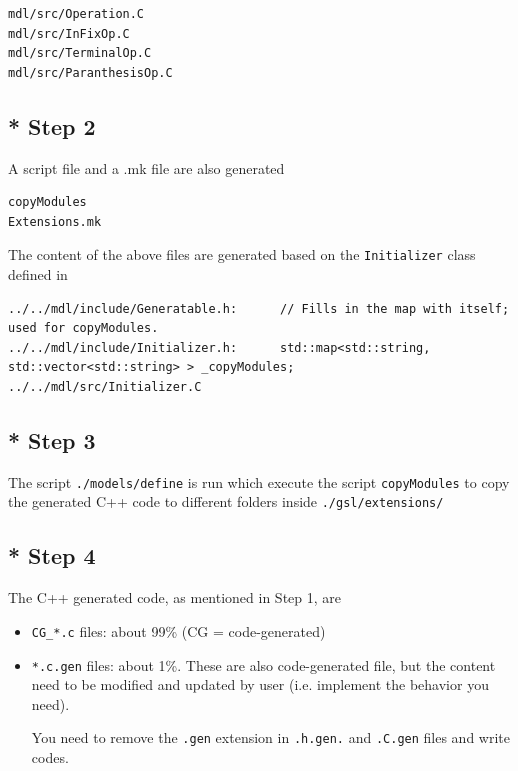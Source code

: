 \begin{verbatim}
mdl/src/Operation.C
mdl/src/InFixOp.C
mdl/src/TerminalOp.C
mdl/src/ParanthesisOp.C
\end{verbatim}


\subsection{* Step 2}

A script file and a .mk file are also generated
\begin{verbatim}
copyModules
Extensions.mk
\end{verbatim}

The content of the above files are generated based on the
\verb!Initializer! class defined in
\begin{verbatim}
../../mdl/include/Generatable.h:      // Fills in the map with itself; used for copyModules.
../../mdl/include/Initializer.h:      std::map<std::string, std::vector<std::string> > _copyModules;
../../mdl/src/Initializer.C
\end{verbatim}

\subsection{* Step 3}

The script \verb!./models/define! is run which execute the script
\verb!copyModules! to copy the generated C++ code to different folders inside
\verb!./gsl/extensions/!



\subsection{* Step 4}

The C++ generated code, as mentioned in Step 1, are
\begin{itemize}
  \item \verb!CG_*.c! files: about 99\% (CG = code-generated)
  
  \item \verb!*.c.gen! files: about 1\%. These are also code-generated file, but
  the content need to be modified and updated by user (i.e. implement the
  behavior you need).
  
  You need to remove the \verb!.gen! extension in \verb!.h.gen.! and 
  \verb!.C.gen! files and write codes.
  
\end{itemize}

